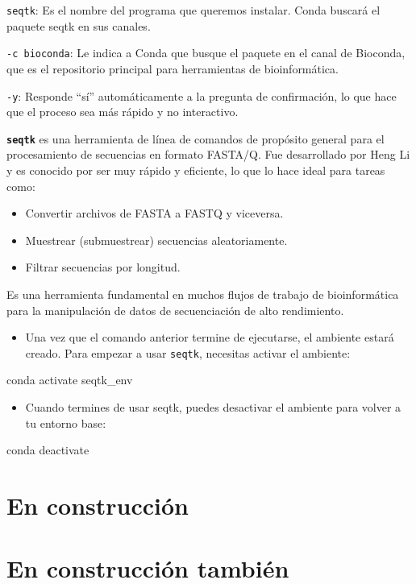 \documentclass[
]{book}
\newenvironment{Shaded}{\begin{snugshade}}{\end{snugshade}}
\newcommand{\ExtensionTok}[1]{#1}
\newcommand{\NormalTok}[1]{#1}
\providecommand{\tightlist}{%
  \setlength{\itemsep}{0pt}\setlength{\parskip}{0pt}}
\begin{document}
\texttt{seqtk}: Es el nombre del programa que queremos instalar. Conda buscará el paquete seqtk en sus canales.

\texttt{-c\ bioconda}: Le indica a Conda que busque el paquete en el canal de Bioconda, que es el repositorio principal para herramientas de bioinformática.

\texttt{-y}: Responde ``sí'' automáticamente a la pregunta de confirmación, lo que hace que el proceso sea más rápido y no interactivo.

\textbf{\texttt{seqtk}} es una herramienta de línea de comandos de propósito general para el procesamiento de secuencias en formato FASTA/Q. Fue desarrollado por Heng Li y es conocido por ser muy rápido y eficiente, lo que lo hace ideal para tareas como:

\begin{itemize}
\item
  Convertir archivos de FASTA a FASTQ y viceversa.
\item
  Muestrear (submuestrear) secuencias aleatoriamente.
\item
  Filtrar secuencias por longitud.
\end{itemize}

Es una herramienta fundamental en muchos flujos de trabajo de bioinformática para la manipulación de datos de secuenciación de alto rendimiento.

\begin{itemize}
\tightlist
\item
  Una vez que el comando anterior termine de ejecutarse, el ambiente estará creado. Para empezar a usar \texttt{seqtk}, necesitas activar el ambiente:
\end{itemize}

\begin{Shaded}
\begin{Highlighting}[]
\ExtensionTok{conda}\NormalTok{ activate seqtk\_env}
\end{Highlighting}
\end{Shaded}

\begin{itemize}
\tightlist
\item
  Cuando termines de usar seqtk, puedes desactivar el ambiente para volver a tu entorno base:
\end{itemize}

\begin{Shaded}
\begin{Highlighting}[]
\ExtensionTok{conda}\NormalTok{ deactivate}
\end{Highlighting}
\end{Shaded}

\chapter{En construcción}\label{en-construcciuxf3n}

\chapter{En construcción también}\label{en-construcciuxf3n-tambiuxe9n}
\end{document}
